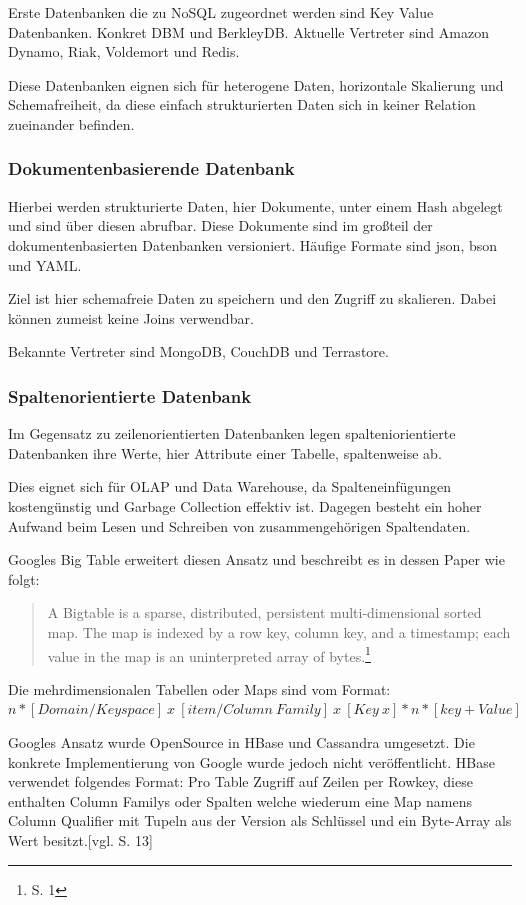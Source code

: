 Erste Datenbanken die zu NoSQL zugeordnet werden sind Key Value Datenbanken. Konkret DBM und BerkleyDB.
Aktuelle Vertreter sind Amazon Dynamo, Riak, Voldemort und Redis.

Diese Datenbanken eignen sich für heterogene Daten, horizontale Skalierung und Schemafreiheit, da diese einfach strukturierten Daten sich in keiner Relation zueinander befinden.

\subsubsection{Dokumentenbasierende Datenbank}

Hierbei werden strukturierte Daten, hier Dokumente, unter einem Hash abgelegt und sind über diesen abrufbar.
Diese Dokumente sind im großteil der dokumentenbasierten Datenbanken versioniert.
Häufige Formate sind \Gls{json}, \Gls{bson} und YAML.

Ziel ist hier schemafreie Daten zu speichern und den Zugriff zu skalieren.
Dabei können zumeist keine Joins verwendbar.

Bekannte Vertreter sind MongoDB, CouchDB und Terrastore.

\subsubsection{Spaltenorientierte Datenbank}

Im Gegensatz zu zeilenorientierten Datenbanken legen spalteniorientierte Datenbanken ihre Werte, hier Attribute einer Tabelle, spaltenweise ab.

Dies eignet sich für OLAP und Data Warehouse, da Spalteneinfügungen kostengünstig und Garbage Collection effektiv ist.
Dagegen besteht ein hoher Aufwand beim Lesen und Schreiben von zusammengehörigen Spaltendaten.

Googles Big Table erweitert diesen Ansatz und beschreibt es in dessen Paper wie folgt:
\begin{quote}
A  Bigtable  is  a  sparse,  distributed,  persistent  multi-dimensional sorted map. The map is indexed by a row key, column key, and a timestamp; each value in the map is an uninterpreted array of bytes.\footnote{\cite{paper:bigtable} S. 1}
\end{quote}
Die mehrdimensionalen Tabellen oder Maps sind vom Format:\\
$n*[Domain / Keyspace]\ x\ [item / Column\ Family]\ x\ [Key\ x]*n*[key+Value]$

Googles Ansatz wurde OpenSource in HBase und Cassandra umgesetzt. Die konkrete Implementierung von Google wurde jedoch nicht veröffentlicht.
HBase verwendet folgendes Format: Pro Table Zugriff auf Zeilen per Rowkey, diese enthalten Column Familys oder Spalten welche wiederum eine Map namens Column Qualifier mit Tupeln aus der Version als Schlüssel und ein Byte-Array als Wert besitzt.[vgl. \cite{ba:dan} S. 13]

